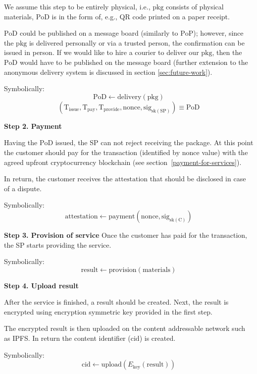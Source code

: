\documentclass{ieeeaccess}
\begin{document}
We assume this step to be entirely physical, i.e., $\mathrm{pkg}$ consists of physical materials, $\mathrm{PoD}$ is in the form of, e.g., QR code printed on a paper receipt. 

$\mathrm{PoD}$ could be published on a message board (similarly to $\mathrm{PoP}$); however, since the $\mathrm{pkg}$ is delivered personally or via a trusted person, the confirmation can be issued in person. If we would like to hire a courier to deliver our $\mathrm{pkg}$, then the $\mathrm{PoD}$ would have to be published on the message board (further extension to the anonymous delivery system is discussed in section \ref{sec:future-work}).

Symbolically: 
\[
\mathrm{PoD} \gets \mathrm{delivery}(\mathrm{pkg})
\]
\[
(\mathrm{T}_\mathrm{issue}, \mathrm{T}_\mathrm{pay}, \mathrm{T}_\mathrm{provide}, \mathrm{nonce}, \mathrm{sig}_{\mathrm{sk}(\mathrm{SP})}) \equiv \mathrm{PoD}
\]

\noindent \textbf
{Step 2. Payment}\label{step-2-payment}

Having the $\mathrm{PoD}$ issued, the SP can not reject receiving the package. At this point the
customer should pay for the transaction (identified by $\mathrm{nonce}$ value) with the agreed upfront cryptocurrency blockchain (see section~\ref{payment-for-services}).

In return, the customer receives the $\mathrm{attestation}$ that should be disclosed in case of a dispute.

Symbolically: 
\[
\mathrm{attestation} \gets \mathrm{payment}(\mathrm{nonce}, \mathrm{sig}_{\mathrm{sk}(\mathrm{C})})
\]

\noindent \textbf
{Step 3. Provision of service}\label{step-3-provision-of-service} 
Once the customer has paid for the transaction, the SP starts providing the service.

Symbolically: 
\[
\mathrm{result} \gets \mathrm{provision}(\mathrm{materials})
\]

\noindent \textbf
{Step 4. Upload result }\label{step-4-results-upload}

After the service is finished, a result should be created. Next, the result is encrypted using encryption symmetric $\mathrm{key}$ provided in the first step.

The encrypted result is then uploaded on the content addressable network such as IPFS. In return the content identifier ($\mathrm{cid}$) is created.

Symbolically: 
\[
\mathrm{cid} \gets \mathrm{upload}(E_{\mathrm{key}}(\mathrm{result}))
\]
\end{document}
